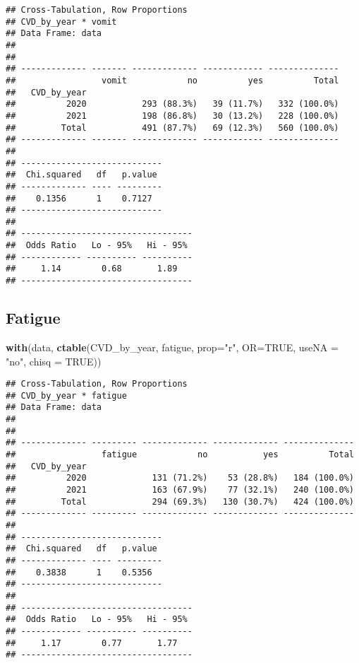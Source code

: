 \documentclass[
]{article}
\newenvironment{Shaded}{\begin{snugshade}}{\end{snugshade}}
\newcommand{\AttributeTok}[1]{\textcolor[rgb]{0.13,0.29,0.53}{#1}}
\newcommand{\ConstantTok}[1]{\textcolor[rgb]{0.56,0.35,0.01}{#1}}
\newcommand{\FunctionTok}[1]{\textcolor[rgb]{0.13,0.29,0.53}{\textbf{#1}}}
\newcommand{\NormalTok}[1]{#1}
\newcommand{\StringTok}[1]{\textcolor[rgb]{0.31,0.60,0.02}{#1}}
\begin{document}
\begin{verbatim}
## Cross-Tabulation, Row Proportions  
## CVD_by_year * vomit  
## Data Frame: data  
## 
## 
## ------------- ------- ------------- ------------ --------------
##                 vomit            no          yes          Total
##   CVD_by_year                                                  
##          2020           293 (88.3%)   39 (11.7%)   332 (100.0%)
##          2021           198 (86.8%)   30 (13.2%)   228 (100.0%)
##         Total           491 (87.7%)   69 (12.3%)   560 (100.0%)
## ------------- ------- ------------- ------------ --------------
## 
## ----------------------------
##  Chi.squared   df   p.value 
## ------------- ---- ---------
##    0.1356      1    0.7127  
## ----------------------------
## 
## ----------------------------------
##  Odds Ratio   Lo - 95%   Hi - 95% 
## ------------ ---------- ----------
##     1.14        0.68       1.89   
## ----------------------------------
\end{verbatim}

\hypertarget{fatigue}{%
\subsection{Fatigue}\label{fatigue}}

\begin{Shaded}
\begin{Highlighting}[]
\FunctionTok{with}\NormalTok{(data, }\FunctionTok{ctable}\NormalTok{(CVD\_by\_year, fatigue, }\AttributeTok{prop=}\StringTok{"r"}\NormalTok{, }\AttributeTok{OR=}\ConstantTok{TRUE}\NormalTok{, }\AttributeTok{useNA =} \StringTok{"no"}\NormalTok{, }\AttributeTok{chisq =} \ConstantTok{TRUE}\NormalTok{))}
\end{Highlighting}
\end{Shaded}

\begin{verbatim}
## Cross-Tabulation, Row Proportions  
## CVD_by_year * fatigue  
## Data Frame: data  
## 
## 
## ------------- --------- ------------- ------------- --------------
##                 fatigue            no           yes          Total
##   CVD_by_year                                                     
##          2020             131 (71.2%)    53 (28.8%)   184 (100.0%)
##          2021             163 (67.9%)    77 (32.1%)   240 (100.0%)
##         Total             294 (69.3%)   130 (30.7%)   424 (100.0%)
## ------------- --------- ------------- ------------- --------------
## 
## ----------------------------
##  Chi.squared   df   p.value 
## ------------- ---- ---------
##    0.3838      1    0.5356  
## ----------------------------
## 
## ----------------------------------
##  Odds Ratio   Lo - 95%   Hi - 95% 
## ------------ ---------- ----------
##     1.17        0.77       1.77   
## ----------------------------------
\end{verbatim}
\end{document}
